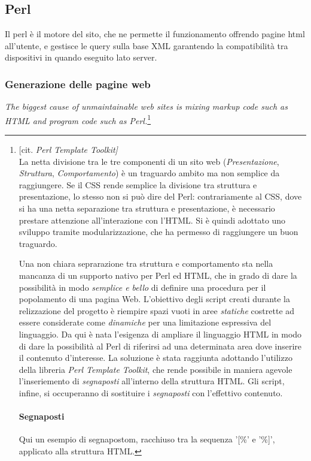 \subsection{Perl}
Il perl \`e il motore del sito, che ne permette il funzionamento offrendo pagine html all'utente, e gestisce le query sulla base XML garantendo la compatibilit\`a tra dispositivi in quando eseguito lato server.
\subsubsection{Generazione delle pagine web}
\textit{The biggest cause of unmaintainable web sites is mixing markup code such as HTML and program code such as Perl.}\footnote{[cit. \textit{Perl Template Toolkit]}\\

La netta divisione tra le tre componenti di un sito web (\textit{Presentazione}, \textit{Struttura}, \textit{Comportamento}) \`e un traguardo ambito ma non semplice da raggiungere. Se il CSS rende semplice la divisione tra struttura e presentazione, lo stesso non si pu\`o dire del Perl: contrariamente al CSS, dove si ha una netta separazione tra struttura e presentazione, \`e necessario prestare attenzione all'interazione con l'HTML. Si \`e quindi adottato uno sviluppo tramite modularizzazione, che ha permesso di raggiungere un buon traguardo.

Una non chiara seprarazione tra struttura e comportamento sta nella mancanza di un supporto nativo per Perl ed HTML, che in grado di dare la possibilit\`a in modo \textit{semplice e bello} di definire una procedura per il popolamento di una pagina Web. L'obiettivo degli script creati durante la relizzazione del progetto \`e riempire spazi vuoti in aree \textit{statiche} costrette ad essere considerate come \textit{dinamiche} per una limitazione espressiva del linguaggio. Da qui \`e nata l'esigenza di ampliare il linguaggio HTML in modo di dare la possibilit\`a al Perl di riferirsi ad una determinata area dove inserire il contenuto d'interesse. La soluzione \`e stata raggiunta adottando l'utilizzo della libreria \textit{Perl Template Toolkit}, che rende possibile in maniera agevole l'inseriemento di \textit{segnaposti} all'interno della struttura HTML. Gli script, infine, si occuperanno di sostituire i \textit{segnaposti} con l'effettivo contenuto.
\paragraph*{Segnaposti} Qui un esempio di segnapostom, racchiuso tra la sequenza '[\%' e '\%]', applicato alla struttura HTML. 

}
